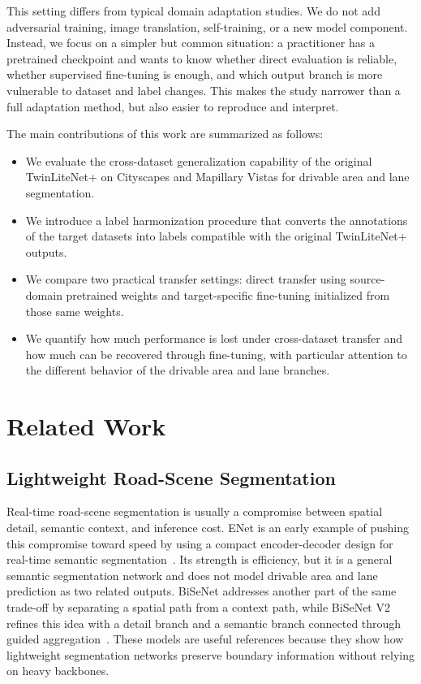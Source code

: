 \documentclass[conference]{IEEEtran}
\begin{document}
This setting differs from typical domain adaptation studies. We do not add adversarial training, image translation, self-training, or a new model component. Instead, we focus on a simpler but common situation: a practitioner has a pretrained checkpoint and wants to know whether direct evaluation is reliable, whether supervised fine-tuning is enough, and which output branch is more vulnerable to dataset and label changes. This makes the study narrower than a full adaptation method, but also easier to reproduce and interpret.

The main contributions of this work are summarized as follows:
\begin{itemize}
  \item We evaluate the cross-dataset generalization capability of the original TwinLiteNet+ on Cityscapes and Mapillary Vistas for drivable area and lane segmentation.
  \item We introduce a label harmonization procedure that converts the annotations of the target datasets into labels compatible with the original TwinLiteNet+ outputs.
  \item We compare two practical transfer settings: direct transfer using source-domain pretrained weights and target-specific fine-tuning initialized from those same weights.
  \item We quantify how much performance is lost under cross-dataset transfer and how much can be recovered through fine-tuning, with particular attention to the different behavior of the drivable area and lane branches.
\end{itemize}

\section{Related Work}

\subsection{Lightweight Road-Scene Segmentation}
Real-time road-scene segmentation is usually a compromise between spatial detail, semantic context, and inference cost. ENet is an early example of pushing this compromise toward speed by using a compact encoder-decoder design for real-time semantic segmentation~\cite{ref5}. Its strength is efficiency, but it is a general semantic segmentation network and does not model drivable area and lane prediction as two related outputs. BiSeNet addresses another part of the same trade-off by separating a spatial path from a context path, while BiSeNet V2 refines this idea with a detail branch and a semantic branch connected through guided aggregation~\cite{ref6,ref7}. These models are useful references because they show how lightweight segmentation networks preserve boundary information without relying on heavy backbones.
\end{document}
